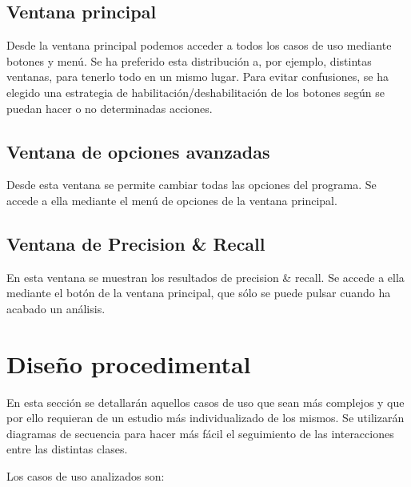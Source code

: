 \subsection{Ventana principal}


Desde la ventana principal podemos acceder a todos los casos de uso mediante botones y menú. Se ha preferido esta distribución a, por ejemplo, distintas ventanas, para tenerlo todo en un mismo lugar. Para evitar confusiones, se ha elegido una estrategia de habilitación/deshabilitación de los botones según se puedan hacer o no determinadas acciones.

\subsection{Ventana de opciones avanzadas}


Desde esta ventana se permite cambiar todas las opciones del programa. Se accede a ella mediante el menú de opciones de la ventana principal.

\subsection{Ventana de Precision \& Recall}


En esta ventana se muestran los resultados de precision \& recall. Se accede a ella mediante el botón de la ventana principal, que sólo se puede pulsar cuando ha acabado un análisis.

\newpage

\section{Diseño procedimental}
En esta sección se detallarán aquellos casos de uso que sean más complejos y que por ello
requieran de un estudio más individualizado de los mismos. Se utilizarán diagramas de secuencia
para hacer más fácil el seguimiento de las interacciones entre las distintas clases.

Los casos de uso analizados son:

